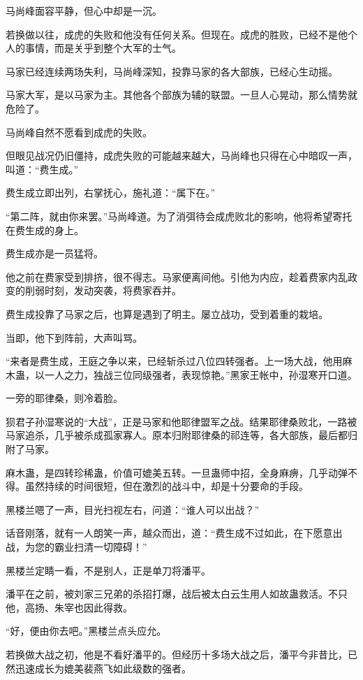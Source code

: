\begin{this_body}
马尚峰面容平静，但心中却是一沉。

若换做以往，成虎的失败和他没有任何关系。但现在。成虎的胜败，已经不是他个人的事情，而是关乎到整个大军的士气。

马家已经连续两场失利，马尚峰深知，投靠马家的各大部族，已经心生动摇。

马家大军，是以马家为主。其他各个部族为辅的联盟。一旦人心晃动，那么情势就危险了。

马尚峰自然不愿看到成虎的失败。

但眼见战况仍旧僵持，成虎失败的可能越来越大，马尚峰也只得在心中暗叹一声，叫道：“费生成。”

费生成立即出列，右掌抚心，施礼道：“属下在。”

“第二阵，就由你来罢。”马尚峰道。为了消弭待会成虎败北的影响，他将希望寄托在费生成的身上。

费生成亦是一员猛将。

他之前在费家受到排挤，很不得志。马家便离间他。引他为内应，趁着费家内乱政变的削弱时刻，发动突袭，将费家吞并。

费生成投靠了马家之后，也算是遇到了明主。屡立战功，受到着重的栽培。

当即，他下到阵前，大声叫骂。

“来者是费生成，王庭之争以来，已经斩杀过八位四转强者。上一场大战，他用麻木蛊，以一人之力，独战三位同级强者，表现惊艳。”黑家王帐中，孙湿寒开口道。

一旁的耶律桑，则冷着脸。

狈君子孙湿寒说的“大战”，正是马家和他耶律盟军之战。结果耶律桑败北，一路被马家追杀，几乎被杀成孤家寡人。原本归附耶律桑的祁连等，各大部族，最后都归附了马家。

麻木蛊，是四转珍稀蛊，价值可媲美五转。一旦蛊师中招，全身麻痹，几乎动弹不得。虽然持续的时间很短，但在激烈的战斗中，却是十分要命的手段。

黑楼兰嗯了一声，目光扫视左右，问道：“谁人可以出战？”

话音刚落，就有一人朗笑一声，越众而出，道：“费生成不过如此，在下愿意出战，为您的霸业扫清一切障碍！”

黑楼兰定睛一看，不是别人，正是单刀将潘平。

潘平在之前，被刘家三兄弟的杀招打爆，战后被太白云生用人如故蛊救活。不只他，高扬、朱宰也因此得救。

“好，便由你去吧。”黑楼兰点头应允。

若换做大战之初，他是不看好潘平的。但经历十多场大战之后，潘平今非昔比，已然迅速成长为媲美裴燕飞如此级数的强者。


\end{this_body}
